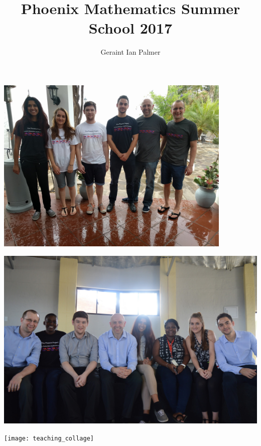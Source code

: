 \documentclass{beamer}
\title
{Phoenix Mathematics Summer School 2017}
\author{Geraint Ian Palmer}
\date{}
\begin{document}
\frame{\titlepage}

\begin{frame}
\begin{center}
\includegraphics[width=0.85\textwidth]{all_tshirt}
\end{center}
\end{frame}

\begin{frame}
\begin{center}
\includegraphics[width=\textwidth]{angelasaara}
\end{center}
\end{frame}

\begin{frame}
\begin{center}
\texttt{[image: teaching\_collage]}
\end{center}
\end{frame}
\end{document}

